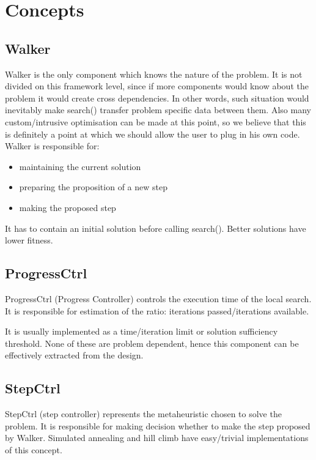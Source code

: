 \section{Concepts}

\subsection{Walker}

Walker is the only component which knows the nature of the problem.
It is not divided on this framework level, since if more components would know about the problem it would create cross dependencies.
In other words, such situation would inevitably make search() transfer problem specific data between them.
Also many custom/intrusive optimisation can be made at this point, so we believe that this is definitely a point at which we should allow the user to plug in
his own code. \\
Walker is responsible for:
\begin{itemize}
\item maintaining the current solution
\item preparing the proposition of a new step
\item making the proposed step
\end{itemize}
It has to contain an initial solution before calling search().
Better solutions have lower fitness.

\subsection{ProgressCtrl}

ProgressCtrl (Progress Controller) controls the execution time of the
local search. It is responsible for estimation of the ratio: iterations
passed/iterations available.

It is usually implemented as a time/iteration limit or solution sufficiency threshold.
None of these are problem dependent, hence this component can be effectively extracted from the design.

\subsection{StepCtrl}

StepCtrl (step controller) represents the metaheuristic chosen to
solve the problem. It is responsible for making decision whether to
make the step proposed by Walker.
Simulated annealing and hill climb have easy/trivial implementations of this concept.

